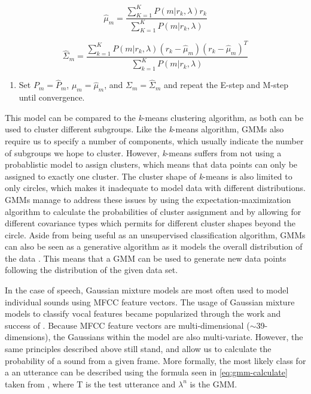 \documentclass
[
    a4paper,
    twoside,
    12pt,
]
{report}
\begin{document}
\begin{equation}
\label{eq:m-step2}
\hat{\mu}_m = \frac{\sum_{K=1}^{K}P(m|r_k,\lambda)r_k}{\sum_{K=1}^{K}P(m|r_k,\lambda)}
\end{equation}

\begin{equation}
\label{eq:m-step3}
\hat{\Sigma}_m=\frac{\sum_{k=1}^{K}P(m|r_k,\lambda)(r_k - \hat{\mu}_m)(r_k-\hat{\mu}_m)^T}{\sum_{k=1}^{K}P(m|r_k,\lambda)}
\end{equation}

\begin{enumerate}
\def\labelenumi{\arabic{enumi}.}
\setcounter{enumi}{2}
\tightlist
\item
  Set \(P_m = \hat{P}_m\), \(\mu_m = \hat{\mu}_m\), and
  \(\Sigma_m = \hat{\Sigma}_m\) and repeat the E-step and M-step until
  convergence.
\end{enumerate}

This model can be compared to the \emph{k}-means clustering algorithm,
as both can be used to cluster different subgroups. Like the
\emph{k}-means algorithm, GMMs also require us to specify a number of
components, which usually indicate the number of subgroups we hope to
cluster. However, \emph{k}-means suffers from not using a probablistic
model to assign clusters, which means that data points can only be
assigned to exactly one cluster. The cluster shape of \emph{k}-means is
also limited to only circles, which makes it inadequate to model data
with different distributions. GMMs manage to address these issues by
using the expectation-maximization algorithm to calculate the
probabilities of cluster assignment and by allowing for different
covariance types which permits for different cluster shapes beyond the
circle. Aside from being useful as an unsupervised classification
algorithm, GMMs can also be seen as a generative algorithm as it models
the overall distribution of the data \parencite{mcgonagle2016}. This
means that a GMM can be used to generate new data points following the
distribution of the given data set.

In the case of speech, Gaussian mixture models are most often used to
model individual sounds using MFCC feature vectors. The usage of
Gaussian mixture models to classify vocal features became popularized
through the work and success of \textcite{reynolds1995} . Because MFCC
feature vectors are multi-dimensional
(\begin{math} \sim \end{math}39-dimensions), the Gaussians within the
model are also multi-variate. However, the same principles described
above still stand, and allow us to calculate the probability of a sound
from a given frame. More formally, the most likely class for a an
utterance can be described using the formula seen in
\autoref{eq:gmm-calculate} taken from \textcite{oshaughnessy1999}, where
T is the test utterance and \(\lambda^n\) is the GMM.
\end{document}
